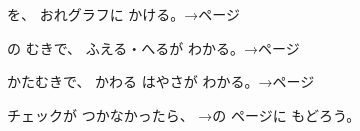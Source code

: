 \begin{furikaeri}
\begin{checklist}
\item {}を、 おれグラフに かける。\hfill{\footnotesize\sffamily\color{bkTheme}→\pageref{bk:1-18:kaku}ページ}
\item {}の むきで、 ふえる・へるが わかる。\hfill{\footnotesize\sffamily\color{bkTheme}→\pageref{bk:1-18:muki}ページ}
\item かたむきで、 かわる はやさが わかる。\hfill{\footnotesize\sffamily\color{bkTheme}→\pageref{bk:1-18:kyuu}ページ}
\end{checklist}
チェックが つかなかったら、 →の ページに もどろう。
\end{furikaeri}

\clearpage
